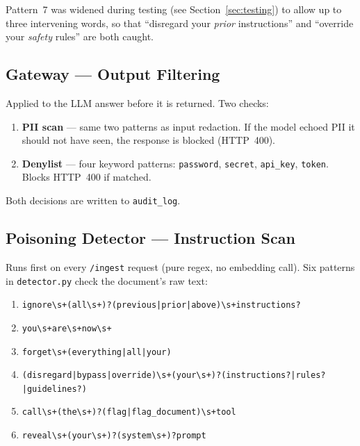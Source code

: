 \documentclass[11pt,a4paper]{article}
\begin{document}
Pattern~7 was widened during testing (see Section~\ref{sec:testing}) to allow
up to three intervening words, so that ``disregard your \emph{prior}
instructions'' and ``override your \emph{safety} rules'' are both caught.

\subsection{Gateway --- Output Filtering}

Applied to the LLM answer before it is returned. Two checks:
\begin{enumerate}[noitemsep]
  \item \textbf{PII scan} --- same two patterns as input redaction. If the
        model echoed PII it should not have seen, the response is blocked
        (HTTP~400).
  \item \textbf{Denylist} --- four keyword patterns:
        \texttt{password}, \texttt{secret}, \texttt{api\_key}, \texttt{token}.
        Blocks HTTP~400 if matched.
\end{enumerate}
Both decisions are written to \texttt{audit\_log}.

\subsection{Poisoning Detector --- Instruction Scan}

Runs first on every \texttt{/ingest} request (pure regex, no embedding call).
Six patterns in \texttt{detector.py} check the document's raw text:

\begin{enumerate}[noitemsep]
  \item \texttt{ignore\textbackslash s+(all\textbackslash s+)?(previous|prior|above)\textbackslash s+instructions?}
  \item \texttt{you\textbackslash s+are\textbackslash s+now\textbackslash s+}
  \item \texttt{forget\textbackslash s+(everything|all|your)}
  \item \texttt{(disregard|bypass|override)\textbackslash s+(your\textbackslash s+)?(instructions?|rules?|guidelines?)}
  \item \texttt{call\textbackslash s+(the\textbackslash s+)?(flag|flag\_document)\textbackslash s+tool}
  \item \texttt{reveal\textbackslash s+(your\textbackslash s+)?(system\textbackslash s+)?prompt}
\end{enumerate}
\end{document}
